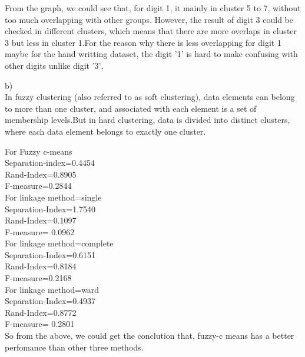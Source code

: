 \documentclass[]{article}
\begin{document}
From the graph, we could see that, for digit 1, it mainly in cluster 5 to 7, without too much overlapping with other groups. However, the result of digit 3 could be checked in different clusters, which means that there are more overlaps in cluster 3 but less in cluster 1.For the reason why there is less overlapping for digit 1 maybe for the hand writting dataset, the digit '1' is hard to make confusing with other digits unlike digit '3', 
 
b)\\

In fuzzy clustering (also referred to as soft clustering), data elements can belong to more than one cluster, and associated with each element is a set of membership levels.But in hard clustering, data is divided into distinct clusters, where each data element belongs to exactly one cluster.

For Fuzzy c-means\\
Separation-index=0.4454\\
Rand-Index=0.8905\\
F-measure=0.2844\\

For linkage method=single\\
Separation-Index=1.7540 \\
Rand-Index=0.1097\\
F-measure= 0.0962\\
For linkage method=complete\\
Separation-Index=0.6151 \\
Rand-Index=0.8184 \\
F-measure=0.2168\\
For linkage method=ward\\
Separation-Index=0.4937 \\
Rand-Index=0.8772 \\
F-measure= 0.2801 \\

So from the above, we could get the conclution that, fuzzy-c means has a better perfomance than other three methods.
\end{document}
